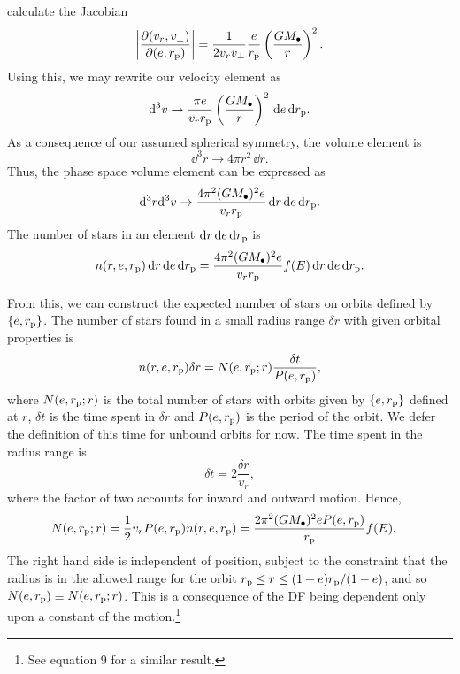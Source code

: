 calculate the Jacobian
\begin{equation}
\left|\dfrac{\partial(v_r, v_\perp)}{\partial(e, r_\mathrm{p})}\right| = \dfrac{1}{2v_rv_\perp}\dfrac{e}{r_\mathrm{p}}\left(\dfrac{GM_\bullet}{r}\right)^2.
\end{equation}
Using this, we may
rewrite our velocity element as
\begin{equation}
\mathrm{d}^3v \rightarrow \dfrac{\pi e}{v_r r_\mathrm{p}}\left(\dfrac{GM_\bullet}{r}\right)^2\,\mathrm{d} e \,\mathrm{d} r_\mathrm{p}.
\end{equation}
As a consequence of our assumed spherical symmetry, 
the volume element is
\begin{equation}
\dd^3r \rightarrow 4\pi r^2 \,\dd r.
\end{equation}
Thus, 
the phase space volume element can be expressed as
\begin{equation}
\mathrm{d}^3r\mathrm{d}^3v \rightarrow \dfrac{4\pi^2(GM_\bullet)^2e}{v_r r_\mathrm{p}}\,\mathrm{d} r\,\mathrm{d} e \,\mathrm{d} r_\mathrm{p}.
\end{equation}
The number of stars in an element $\mathrm{d} r\,\mathrm{d} e\,\mathrm{d} r_\mathrm{p}$ is
\begin{equation}
n(r, e, r_\mathrm{p})\,\mathrm{d} r\,\mathrm{d} e\,\mathrm{d} r_\mathrm{p} = \dfrac{4\pi^2(GM_\bullet)^2e}{v_r r_\mathrm{p}}f(E)\,\mathrm{d} r\,\mathrm{d} e\,\mathrm{d} r_\mathrm{p}.
\end{equation}

From this, we can construct the expected number of stars on orbits defined by $\{e, r_\mathrm{p}\}$. The number of stars found in a small radius range $\delta r$ with given orbital properties is
\begin{equation}
n(r, e, r_\mathrm{p})\delta r = N(e, r_\mathrm{p}; r)\dfrac{\delta t}{P(e, r_\mathrm{p})},
\end{equation}
where $N(e, r_\mathrm{p}; r)$ is the total number of stars with orbits given by $\{e, r_\mathrm{p}\}$ defined at $r$, $\delta t$ is the time spent in $\delta r$ and $P(e, r_\mathrm{p})$ is the period of the orbit. We defer the definition of this time for unbound orbits for now. The time spent in the radius range is
\begin{equation}
\delta t = 2\dfrac{\delta r}{v_r},
\end{equation}
where the factor of two accounts for inward and outward motion. Hence,
\begin{align}
N(e, r_\mathrm{p}; r) = {} & \dfrac{1}{2} v_r P(e, r_\mathrm{p}) n(r, e, r_\mathrm{p}) = \dfrac{2\pi^2(GM_\bullet)^2 e P(e, r_\mathrm{p})}{r_\mathrm{p}}f(E).
\end{align}
The right hand side is independent of position, subject to the constraint that the radius is in the allowed range for the orbit $r_\mathrm{p} \leq r \leq (1+e)r_\mathrm{p}/(1-e)$, and so $N(e, r_\mathrm{p}) \equiv N(e, r_\mathrm{p}; r)$. This is a consequence of the DF being dependent only upon a constant of the motion.\footnote{See \citet{Bahcall1976} equation 9 for a similar result.}

